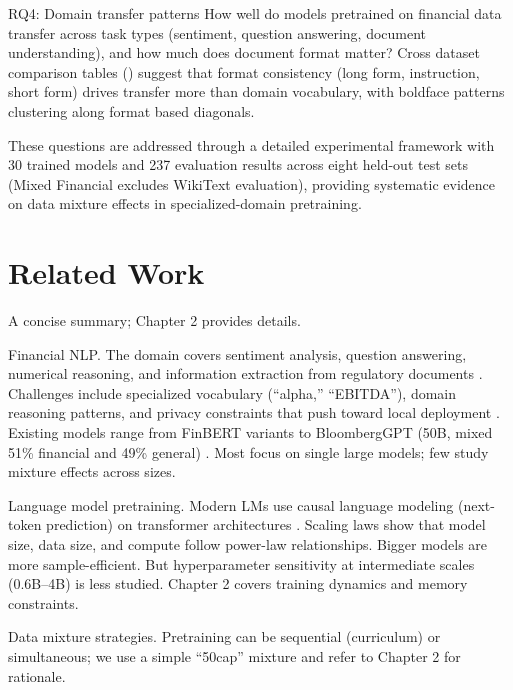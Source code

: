 RQ4: Domain transfer patterns
How well do models pretrained on financial data transfer across task types (sentiment, question answering, document understanding), and how much does document format matter? Cross dataset comparison tables () suggest that format consistency (long form, instruction, short form) drives transfer more than domain vocabulary, with boldface patterns clustering along format based diagonals.

These questions are addressed through a detailed experimental framework with 30 trained models and 237 evaluation results across eight held-out test sets (Mixed Financial excludes WikiText evaluation), providing systematic evidence on data mixture effects in specialized-domain pretraining.

\section{Related Work}

A concise summary; Chapter 2 provides details.

Financial NLP. The domain covers sentiment analysis, question answering, numerical reasoning, and information extraction from regulatory documents \parencite{araci2019finbert, chen2021finqa}. Challenges include specialized vocabulary (``alpha,'' ``EBITDA''), domain reasoning patterns, and privacy constraints that push toward local deployment \parencite{wu2023bloomberggpt}. Existing models range from FinBERT variants \parencite{araci2019finbert, yang2020finbert} to BloombergGPT (50B, mixed 51\% financial and 49\% general) \parencite{wu2023bloomberggpt}. Most focus on single large models; few study mixture effects across sizes.

Language model pretraining. Modern LMs use causal language modeling (next-token prediction) on transformer architectures \parencite{vaswani2017attention, radford2019language, brown2020language}. Scaling laws \parencite{kaplan2020scaling, hoffmann2022training} show that model size, data size, and compute follow power-law relationships. Bigger models are more sample-efficient. But hyperparameter sensitivity at intermediate scales (0.6B–4B) is less studied. Chapter 2 covers training dynamics and memory constraints.

Data mixture strategies. Pretraining can be sequential (curriculum) or simultaneous; we use a simple “50cap” mixture and refer to Chapter 2 for rationale.

